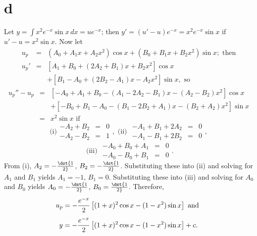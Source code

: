 \documentclass[dvips]{book}
\numberwithin{example}{section}
\numberwithin{equation}{section}
\numberwithin{theorem}{section}
\numberwithin{table}{section}
\numberwithin{figure}{section}
\begin{document}
\part{d} Let $y=\int x^2e^{-x}\sin x\,dx=ue^{-x}$; then
$y'=(u'-u)e^{-x}=x^2e^{-x}\sin x$ if $u'-u=x^2\sin x$.
Now let
\begin{eqnarray*}
u_p&=&(A_0+A_1x+A_2x^2)\cos x +(B_0+B_1x+B_2x^2)\sin x;\mbox{ then}\\
u_p'&=&\left[A_1+B_0+(2A_2+B_1)x+B_2x^2\right]\cos x\\ &&
+\left[B_1-A_0+(2B_2-A_1)x-A_2x^2\right]\sin x, \mbox{ so}
\end{eqnarray*}
\begin{eqnarray*}
u_p''-u_p&=&\left[-A_0+A_1+B_0-(A_1-2A_2-B_1)x-(A_2-B_2)x^2\right]\cos
 x\\ && +\left[-B_0+B_1-A_0-(B_1-2B_2+A_1)x-(B_2+A_2)x^2\right]\sin
x\\ &=&x^2\sin x \mbox{ if}
\end{eqnarray*}
$$
\mbox{(i)}
\begin{array}{rcl} -A_2+B_2&=&0\\ -A_2-B_2&=&1 \end{array},
\mbox{ (ii) }
\begin{array}{rcl}
-A_1+B_1+2A_2&=&0\\ -A_1-B_1+2B_2&=&0\end{array},
$$
$$
\mbox{ (iii) }
\begin{array}{rcl} -A_0+B_0+A_1&=&0\\ -A_0-B_0+B_1&=&0
\end{array}.
$$
From (i), $A_2=-\dst{1\over2}$, $B_2=-\dst{1\over2}$. Substituting
these into (ii) and solving for $A_1$ and $B_1$ yields $A_1=-1$,
$B_1=0$. Substituting these into (iii) and solving for $A_0$ and $B_0$
yields $A_0=-\dst{1\over2}$, $B_0=\dst{1\over2}$. Therefore,
$$
 u_p=-{e^{-x}\over2}\left[(1+x)^2\cos x-(1-x^2)\sin
x \right] \mbox{ and }
$$
$$
y=-{e^{-x}\over2}\left[(1+x)^2\cos x-(1-x^2)\sin
x \right]+c.
$$
\end{document}
